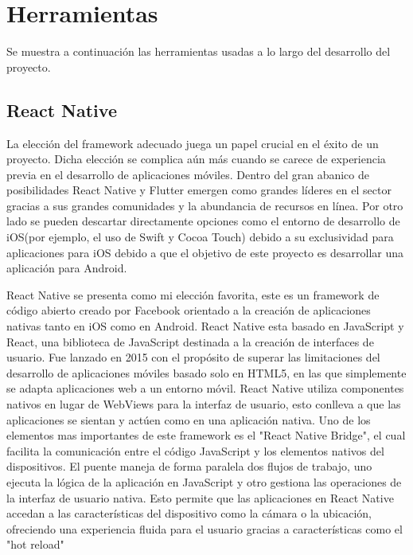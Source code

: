 

\section{Herramientas}

Se muestra a continuación las herramientas usadas a lo largo del desarrollo del proyecto.

\subsection{React Native}

La elección del framework adecuado juega un papel crucial en el éxito de un proyecto. Dicha elección se complica aún más cuando se carece de experiencia previa en el desarrollo de aplicaciones móviles. Dentro del gran abanico de posibilidades React Native y Flutter emergen como grandes líderes en el sector gracias a sus grandes comunidades y la abundancia de recursos en línea. Por otro lado se pueden descartar directamente opciones como el entorno de desarrollo de iOS(por ejemplo, el uso de Swift y Cocoa Touch) debido a su exclusividad para aplicaciones para iOS debido a que el objetivo de este proyecto es desarrollar una aplicación para Android.

React Native se presenta como mi elección favorita, este es un framework de código abierto creado por Facebook orientado a la creación de aplicaciones nativas tanto en iOS como en Android. React Native esta basado en JavaScript y React, una biblioteca de JavaScript destinada a la creación de interfaces de usuario. Fue lanzado en 2015 con el propósito de superar las limitaciones del desarrollo de aplicaciones móviles basado solo en HTML5, en las que simplemente se adapta aplicaciones web a un entorno móvil. React Native utiliza componentes nativos en lugar de WebViews para la interfaz de usuario, esto conlleva a que las aplicaciones se sientan y actúen como en una aplicación nativa.
Uno de los elementos mas importantes de este framework es el "React Native Bridge", el cual facilita la comunicación entre el código JavaScript y los elementos nativos del dispositivos. El puente maneja de forma paralela dos flujos de trabajo, uno ejecuta la lógica de la aplicación en JavaScript y otro gestiona las operaciones de la interfaz de usuario nativa. Esto permite que las aplicaciones en React Native accedan a las características del dispositivo como la cámara o la ubicación, ofreciendo una experiencia fluida para el usuario gracias a características como el "hot reload"

